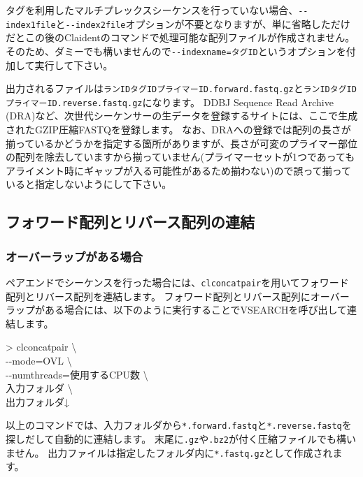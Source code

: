 \documentclass[titlepage,10pt,a4paper]{jsbook}
\newenvironment{cmd}{\begin{oframed}\raggedright\ttfamily\footnotesize\setlength{\baselineskip}{1.4em}}{\end{oframed}\vspace{-1em}}
\begin{document}
タグを利用したマルチプレックスシーケンスを行っていない場合、\texttt{{-}{-}index1file}と\texttt{{-}{-}index2file}オプションが不要となりますが、単に省略しただけだとこの後のClaidentのコマンドで処理可能な配列ファイルが作成されません。
そのため、ダミーでも構いませんので\texttt{{-}{-}indexname=タグID}というオプションを付加して実行して下さい。

出力されるファイルは\texttt{ランID{\textunderscore}{\textunderscore}タグID{\textunderscore}{\textunderscore}プライマーID.forward.fastq.gz}と\texttt{ランID{\textunderscore}{\textunderscore}タグID{\textunderscore}{\textunderscore}プライマーID.reverse.fastq.gz}になります。
DDBJ Sequence Read Archive (DRA)など、次世代シーケンサーの生データを登録するサイトには、ここで生成されたGZIP圧縮FASTQを登録します。
なお、DRAへの登録では配列の長さが揃っているかどうかを指定する箇所がありますが、長さが可変のプライマー部位の配列を除去していますから揃っていません(プライマーセットが1つであってもアライメント時にギャップが入る可能性があるため揃わない)ので誤って揃っていると指定しないようにして下さい。

\subsection{フォワード配列とリバース配列の連結}\label{subsection:concatenatingpairedend}

\subsubsection{オーバーラップがある場合}

ペアエンドでシーケンスを行った場合には、\texttt{clconcatpair}を用いてフォワード配列とリバース配列を連結します。
フォワード配列とリバース配列にオーバーラップがある場合には、以下のように実行することでVSEARCHを呼び出して連結します。

\begin{cmd}
{\textgreater} clconcatpair {\textbackslash}\\
{-}{-}mode=OVL {\textbackslash}\\
{-}{-}numthreads=使用するCPU数 {\textbackslash}\\
入力フォルダ {\textbackslash}\\
出力フォルダ↓
\end{cmd}

以上のコマンドでは、入力フォルダから\texttt{*.forward.fastq}と\texttt{*.reverse.fastq}を探しだして自動的に連結します。
末尾に\texttt{.gz}や\texttt{.bz2}が付く圧縮ファイルでも構いません。
出力ファイルは指定したフォルダ内に\texttt{*.fastq.gz}として作成されます。
\end{document}
